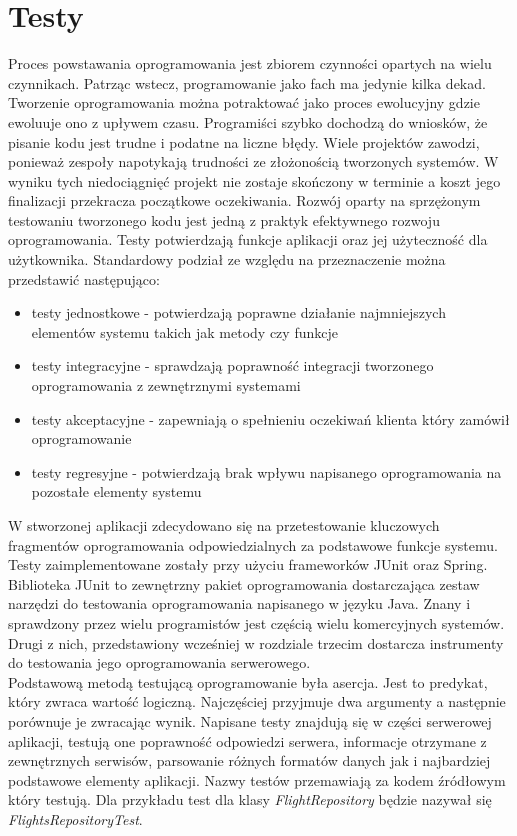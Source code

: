 \documentclass[12pt, twoside]{report}
\begin{document}
\chapter{Testy}
Proces powstawania oprogramowania jest zbiorem czynności opartych na wielu czynnikach. Patrząc wstecz, programowanie jako fach ma jedynie kilka dekad. Tworzenie oprogramowania można potraktować jako proces ewolucyjny gdzie ewoluuje ono z upływem czasu. Programiści szybko dochodzą do wniosków, że pisanie kodu jest trudne i podatne na liczne błędy. Wiele projektów zawodzi, ponieważ zespoły napotykają trudności ze złożonością tworzonych systemów. W wyniku tych niedociągnięć projekt nie zostaje skończony w terminie a koszt jego finalizacji przekracza początkowe oczekiwania\cite{testing}. Rozwój oparty na sprzężonym testowaniu tworzonego kodu jest jedną z praktyk efektywnego rozwoju oprogramowania. Testy potwierdzają funkcje aplikacji oraz jej użyteczność dla użytkownika. Standardowy podział ze względu na przeznaczenie można przedstawić następująco:
\begin{itemize}[noitemsep,topsep=0pt]
\item testy jednostkowe - potwierdzają poprawne działanie najmniejszych elementów systemu takich jak metody czy funkcje
\item testy integracyjne - sprawdzają poprawność integracji tworzonego oprogramowania z zewnętrznymi systemami
\item testy akceptacyjne - zapewniają o spełnieniu oczekiwań klienta który zamówił oprogramowanie
\item testy regresyjne - potwierdzają brak wpływu napisanego oprogramowania na pozostałe elementy systemu
\end{itemize}
W stworzonej aplikacji zdecydowano się na przetestowanie kluczowych fragmentów oprogramowania odpowiedzialnych za podstawowe funkcje systemu. Testy zaimplementowane zostały przy użyciu frameworków JUnit oraz Spring. Biblioteka JUnit to zewnętrzny pakiet oprogramowania dostarczająca zestaw narzędzi do testowania oprogramowania napisanego w języku Java. Znany i sprawdzony przez wielu programistów jest częścią wielu komercyjnych systemów. Drugi z nich, przedstawiony wcześniej w rozdziale trzecim dostarcza instrumenty do testowania jego oprogramowania serwerowego. \\ \indent
Podstawową metodą testującą oprogramowanie była asercja. Jest to predykat, który zwraca wartość logiczną. Najczęściej przyjmuje dwa argumenty a następnie porównuje je zwracając wynik\cite{assertion}. Napisane testy znajdują się w części serwerowej aplikacji, testują one poprawność odpowiedzi serwera, informacje otrzymane z zewnętrznych serwisów, parsowanie różnych formatów danych jak i najbardziej podstawowe elementy aplikacji. Nazwy testów przemawiają za kodem źródłowym który testują. Dla przykładu test dla klasy \textit{FlightRepository} będzie nazywał się \textit{FlightsRepositoryTest}. \\
\end{document}
